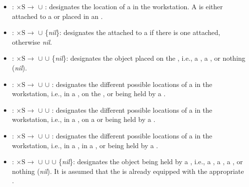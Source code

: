\begin{itemize}
\item {}: $\mathrm{\times S\rightarrow}$ $\cup$ : designates the location of a  in the workstation. A  is either attached to a  or placed in an .

\item {}: $\mathrm{\times S\rightarrow}$ $\cup$ \{\textit{nil}\}: designates the  attached to a  if there is one attached, otherwise \textit{nil}.

\item {}: $\mathrm{\times S\rightarrow}$ $\cup$  $\cup$ \{\textit{nil}\}: designates the object placed on the , i.e., a , a , or nothing (\textit{nil}).

\item {}: $\mathrm{\times S\rightarrow}$ $\cup$  $\cup$ : designates the different possible locations of a  in the workstation, i.e., in a , on the , or being held by a .

\item {}: $\mathrm{\times S\rightarrow}$ $\cup$  $\cup$ : designates the different possible locations of a  in the workstation, i.e., in a , on a  or being held by a .

\item {}: $\mathrm{\times S\rightarrow}$ $\cup$  $\cup$ : designates the different possible locations of a  in the workstation, i.e., in a , in a , or being held by a .

\item {}: $\mathrm{\times S\rightarrow}$ $\cup$  $\cup$  $\cup$ \{\textit{nil}\}: designates the object being held by a , i.e., a , a , a , or nothing (\textit{nil}). It is assumed that the  is already equipped with the appropriate .


\end{itemize}

